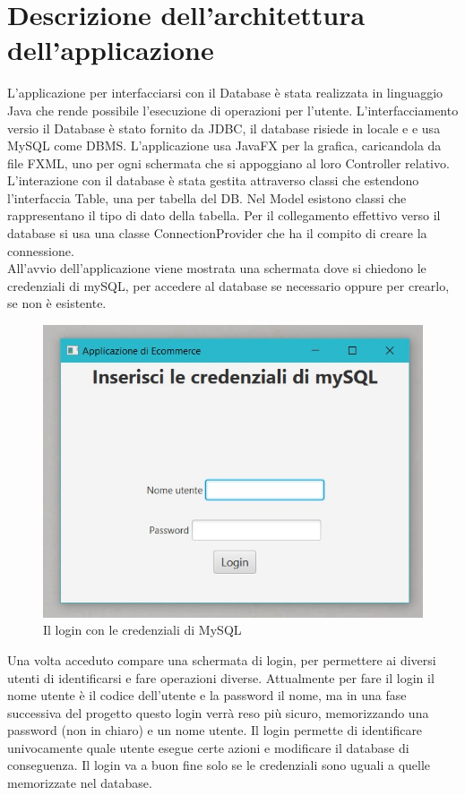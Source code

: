 \documentclass[a4paper,12pt]{report}
\begin{document}
\section{Descrizione dell'architettura dell'applicazione}
L'applicazione per interfacciarsi con il Database è stata realizzata in linguaggio Java che rende possibile l'esecuzione di operazioni per l'utente. 
L'interfacciamento versio il Database è stato fornito da JDBC, il database risiede in locale e e usa MySQL come DBMS. 
L'applicazione usa JavaFX per la grafica, caricandola da file FXML, uno per ogni schermata che si appoggiano al loro Controller relativo. 
L'interazione con il database è stata gestita attraverso classi che estendono l'interfaccia Table, una per tabella del DB. 
Nel Model esistono classi che rappresentano il tipo di dato della tabella. Per il collegamento effettivo verso il database si usa una classe ConnectionProvider che ha il compito di creare la connessione.
\\
All'avvio dell'applicazione viene mostrata una schermata dove si chiedono le credenziali di mySQL, per accedere al database se necessario oppure per crearlo, se non è esistente.
\begin{figure}[H]
	\centering{}
	\includegraphics[width=\textwidth]{img/Application/Credentials.jpg}
	\caption{Il login con le credenziali di MySQL}
\end{figure}
Una volta acceduto compare una schermata di login, per permettere ai diversi utenti di identificarsi e fare operazioni diverse.
Attualmente per fare il login il nome utente è il codice dell'utente e la password il nome, ma in una fase successiva del progetto questo login verrà reso più sicuro, memorizzando una password (non in chiaro) e un nome utente. 
Il login permette di identificare univocamente quale utente esegue certe azioni e modificare il database di conseguenza. Il login va a buon fine solo se le credenziali sono uguali a quelle memorizzate nel database.
\end{document}
